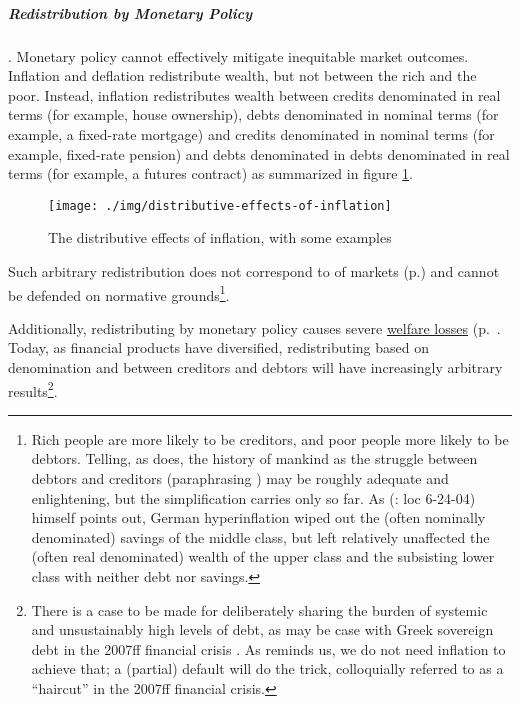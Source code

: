 \subparagraph{Redistribution by Monetary Policy}  \label{sec:distributive-effects-of-inflation}.  Monetary policy cannot effectively mitigate inequitable market outcomes. Inflation and deflation redistribute wealth, but not between the rich and the poor. Instead, inflation redistributes wealth between credits denominated in real terms (for example, house ownership), debts denominated in nominal terms (for example, a fixed-rate mortgage) and credits denominated in nominal terms (for example, fixed-rate pension) and debts denominated in debts denominated in real terms (for example, a futures contract) as summarized in figure \ref{fig:distributive-effects-of-inflation}.

\begin{figure}[htbp]
	\centering
	\texttt{[image: ./img/distributive-effects-of-inflation]}
	\caption[Distributive Effects of Inflation]{The distributive effects of inflation, with some examples}
	\label{fig:distributive-effects-of-inflation}
\end{figure}

Such arbitrary redistribution does not correspond to  of markets  (p.\pageref{sec:inequalitydynamics}) and cannot be defended on normative grounds\footnote{
	Rich people are more likely to be creditors, and poor people more likely to be debtors. Telling, as \cite{Coggan2011} does, the history of mankind as the struggle between debtors and creditors (paraphrasing \citealt{Marx-1867-aa}) may be roughly adequate and enlightening, but the simplification carries only so far. As \citeauthor{Coggan2011}(\citeyear{Coggan2011}: loc 6-24-04) himself points out, German hyperinflation wiped out the (often nominally denominated) savings of the middle class, but left relatively unaffected the (often real denominated) wealth of the upper class and the subsisting lower class with neither debt nor savings.}.

Additionally, redistributing by monetary policy causes severe \hyperref[sec:price-stability]{welfare losses} (p.~\pageref{sec:price-stability}. Today, as financial products have diversified, redistributing based on denomination and between creditors and debtors will have increasingly arbitrary results\footnote{
	There is a case to be made for deliberately sharing the burden of systemic and unsustainably high levels of debt, as may be case with Greek sovereign debt in the 2007ff financial crisis \citep{Coggan2011}. As \citeauthor{Coggan2011} reminds us, we do not need inflation to achieve that; a (partial) default will do the trick, colloquially referred to as a ``haircut'' in the 2007ff financial crisis.}.

